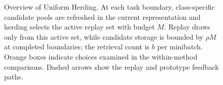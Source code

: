 \begin{figure}[tbp]

\caption{Overview of Uniform Herding. At each task boundary, class-specific
candidate pools are refreshed in the current representation and herding selects
the active replay set with budget $M$. Replay draws only from this active set,
while candidate storage is bounded by $\rho M$ at completed boundaries; the
retrieval count is $b$ per minibatch. Orange boxes indicate choices examined in
the within-method comparisons. Dashed arrows show the replay and prototype
feedback paths.}
\label{fig:system-overview}
\end{figure}
